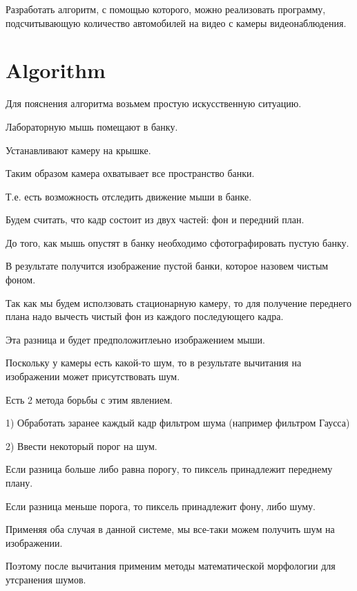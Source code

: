 \documentclass[12pt,a4paper,oneside,titlepage]{article}
\begin{document}
Разработать алгоритм, с помощью которого, можно реализовать программу, подсчитывающую количество автомобилей на видео с камеры видеонаблюдения.













\newpage
\section*{Algorithm}
Для пояснения алгоритма возьмем простую искусственную ситуацию.

Лабораторную мышь помещают в банку.

Устанавливают камеру на крышке.

Таким образом камера охватывает все пространство банки.

Т.е. есть возможность отследить движение мыши в банке.

Будем считать, что кадр состоит из двух частей: фон и передний план.

До того, как мышь опустят в банку необходимо сфотографировать пустую банку.

В результате получится изображение пустой банки, которое назовем чистым фоном.

Так как мы будем исползовать стационарную камеру, то для получение переднего плана надо вычесть чистый фон из каждого последующего кадра.

Эта разница и будет предположитлеьно изображением мыши.

Поскольку у камеры есть какой-то шум, то в результате вычитания на изображении может присутствовать шум.

Есть 2 метода борьбы с этим явлением.

1) Обработать заранее каждый кадр фильтром шума (например фильтром Гаусса)

2) Ввести некоторый порог на шум.

Если разница больше либо равна порогу, то пиксель принадлежит переднему плану.

Если разница меньше порога, то пиксель принадлежит фону, либо шуму.

Применяя оба случая в данной системе, мы все-таки можем получить шум на изображении.

Поэтому после вычитания применим методы математической морфологии для утсранения шумов.
\end{document}
